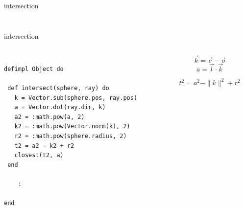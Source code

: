 \begin{frame}{intersection}
\begin{columns}
\begin{column}{0.4\linewidth}
\begin{figure}
\end{figure}
 \end{column}
\pause 
\begin{column}{0.6\linewidth}
  \pause
  \begin{itemize}
  \end{itemize}
 \end{column}
\end{columns} 
\end{frame}


\begin{frame}[fragile]{intersection}

\begin{columns}
 \begin{column}{0.6\linewidth}
\begin{verbatim}

defimpl Object do

 def intersect(sphere, ray) do
   k = Vector.sub(sphere.pos, ray.pos)
   a = Vector.dot(ray.dir, k)
   a2 = :math.pow(a, 2)
   k2 = :math.pow(Vector.norm(k), 2)
   r2 = :math.pow(sphere.radius, 2)
   t2 = a2 - k2 + r2
   closest(t2, a)
 end

    :

end

\end{verbatim}
 \end{column}
\pause
 \begin{column}{0.4\linewidth}
$$\vec{k} =  \vec{c} - \vec{o}$$
$$a = \vec{l}\cdot\vec{k}$$

$${t}^2 = {a}^2 - \|k\|^2 + {r}^2 $$
 \end{column}
\end{columns}
\end{frame}


